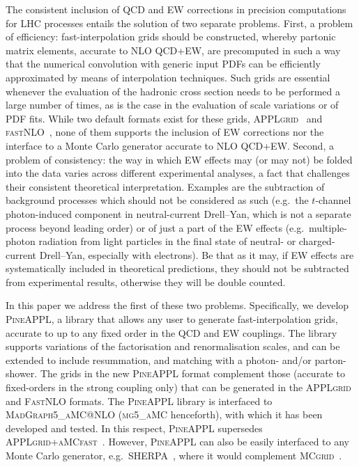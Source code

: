 The consistent inclusion of QCD and EW corrections in precision computations for
LHC processes entails
the solution of two separate problems. First, a problem of efficiency:
fast-interpolation grids should be constructed, whereby partonic matrix 
elements, accurate to NLO QCD+EW, are precomputed in such a way that the 
numerical convolution with generic input PDFs can be efficiently approximated
by means of interpolation techniques. Such grids are essential
whenever the evaluation of the hadronic cross section needs to 
be performed a large number of times, as is the case in the evaluation of
scale variations or of PDF fits. While two default formats exist for
these grids, \textsc{APPLgrid}~\cite{Carli:2010rw} and
\textsc{fastNLO}~\cite{Kluge:2006xs,Wobisch:2011ij,Britzger:2012bs}, none of them supports the inclusion of EW
corrections nor the interface to a Monte Carlo generator accurate to 
NLO QCD+EW\@. Second, a problem of consistency: the way in which EW effects may
(or may not) be folded into the data varies across different experimental 
analyses, a fact that challenges their consistent theoretical interpretation. 
Examples are the subtraction of background processes which should not be 
considered as such (e.g.\ the $t$-channel photon-induced component in
neutral-current Drell--Yan, which is not a separate process beyond leading
order) or of just a part of the EW effects (e.g.\ multiple-photon
radiation from light particles in the final state of neutral- or charged-current
Drell--Yan, especially with electrons). Be that as it may, if EW effects are
systematically included in theoretical predictions, they should not be subtracted
from experimental results, otherwise they will be double counted.

In this paper we address the first of these two problems. Specifically, 
we develop \textsc{PineAPPL}, a library that allows any user to generate
fast-interpolation grids, accurate to up to any fixed order in the QCD and
EW couplings. The library supports variations of the factorisation
and renormalisation scales, and can be extended to include
resummation, and matching with a photon- and/or parton-shower.
The grids in the new \textsc{PineAPPL} format complement those
(accurate to fixed-orders in the strong coupling only) that can be generated 
in the \textsc{APPLgrid} and \textsc{FastNLO} formats. The \textsc{PineAPPL}
library is interfaced to \textsc{MadGraph5\_aMC@NLO} (\textsc{mg5\_aMC}
henceforth), with which it has been developed and tested. In this respect,
\textsc{PineAPPL} supersedes
\textsc{APPLgrid}+\textsc{aMCfast}~\cite{Bertone:2014zva}.
However, \textsc{PineAPPL} can also be easily interfaced to any Monte Carlo generator,
e.g.\ \textsc{SHERPA}~\cite{Biedermann:2017yoi}, where it would complement
\textsc{MCgrid}~\cite{DelDebbio:2013kxa,Bothmann:2015dba}.

